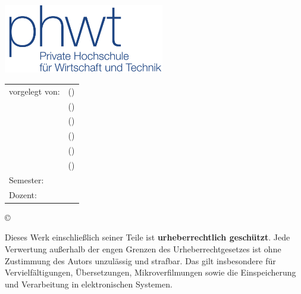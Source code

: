 \thispagestyle{plain}
\begin{titlepage}
	
	\begin{center}
		
		\huge{\textsc{\textbf{\titel}}}\\[1.5ex]
		\LARGE{\textbf{\art}}\\[4ex]
				\vfill
		
		\begin{minipage}{0.5\textwidth}
			\centering
			\includegraphics[width=7cm]{Grafiken/Logo_PHWT}
		\end{minipage}%
		\hfill%
		
		
		
		\vfill
		\normalsize
		\begin{tabular}{w{5.4cm}p{7cm}}
			vorgelegt von:   & \quad \autorC (\matrikelC) \\
						     & \quad \autorDra (\matrikelDra) \\
					         & \quad \autorDre (\matrikelDre)\\
						     & \quad \autorK (\matrikelK)\\
						     & \quad \autorP (\matrikelP)\\
							 & \quad \autorS (\matrikelS)\\
			Semester:        & \quad \semester  \\    
			Dozent:          & \quad \erstgutachter  \\
		\end{tabular}
		\vfill
		\copyright\ \jahr\\[1.5ex]
		
	\end{center}
	
	\singlespacing
	\small
	\noindent Dieses Werk einschließlich seiner Teile ist \textbf{urheberrechtlich geschützt}. Jede Verwertung außerhalb der engen Grenzen des Urheberrechtgesetzes ist ohne Zustimmung des Autors unzulässig und strafbar. Das gilt insbesondere für Vervielfältigungen, Übersetzungen, Mikroverfilmungen sowie die Einspeicherung und Verarbeitung in elektronischen Systemen. 
	
\end{titlepage}
